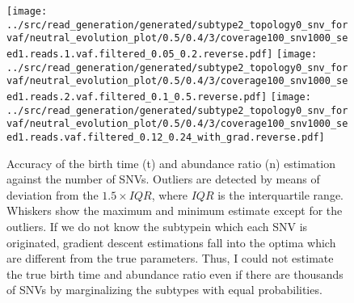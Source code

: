 \documentclass{article}
\begin{document}
\begin{figure}[H]
 \texttt{[image: ../src/read\_generation/generated/subtype2\_topology0\_snv\_forvaf/neutral\_evolution\_plot/0.5/0.4/3/coverage100\_snv1000\_seed1.reads.1.vaf.filtered\_0.05\_0.2.reverse.pdf]}
 \texttt{[image: ../src/read\_generation/generated/subtype2\_topology0\_snv\_forvaf/neutral\_evolution\_plot/0.5/0.4/3/coverage100\_snv1000\_seed1.reads.2.vaf.filtered\_0.1\_0.5.reverse.pdf]}
 \texttt{[image: ../src/read\_generation/generated/subtype2\_topology0\_snv\_forvaf/neutral\_evolution\_plot/0.5/0.4/3/coverage100\_snv1000\_seed1.reads.vaf.filtered\_0.12\_0.24\_with\_grad.reverse.pdf]}
\end{figure}

\begin{figure}[H]
   \caption{
 Accuracy of the birth time (t) and abundance ratio (n) estimation against the number of SNVs. Outliers are detected by means of deviation from the $1.5 \times IQR$, where $IQR$ is the interquartile range. Whiskers show the maximum and minimum estimate except for the outliers. If we do not know the subtypein which each SNV is originated, gradient descent estimations fall into the optima which are different from the true parameters. Thus, I could not estimate the true birth time and abundance ratio even if there are thousands of SNVs by marginalizing the subtypes with equal probabilities.
  }
 \label{fig: binom_subtype_ungiven}
\end{figure}
\end{document}
